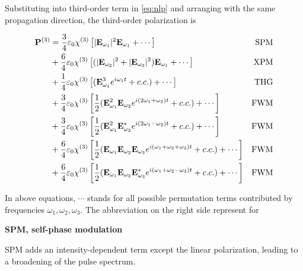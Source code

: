 Substituting into third-order term in \autoref{eq:nlp} and arranging with the same propagation direction, the third-order polarization is 

\begin{align}
  \vb{P}^{(3)} 
  & = \frac{3}{4} \varepsilon_0 \chi^{(3)} \left[| \vb{E}_{\omega_1} |^2 \vb{E}_{\omega_1} + \cdots\right] & \mathrm{SPM} \\
  & + \frac{6}{4} \varepsilon_0 \chi^{(3)} \left[(| \vb{E}_{\omega_2} |^2 + |\vb{E}_{\omega_3} |^2) \vb{E}_{\omega_1} + \cdots \right] & \mathrm{XPM} \\
  & + \frac{1}{4} \varepsilon_0 \chi^{(3)} \left[(\vb{E}_{\omega_1}^3 e^{i \omega_1 t} + c.c.) + \cdots\right] & \mathrm{THG} \\
  & + \frac{3}{4} \varepsilon_0 \chi^{(3)} \left[ \frac{1}{2} (\vb{E}_{\omega_1}^2 \vb{E}_{\omega_2} e^{i (2 \omega_1 + \omega_2) t} + c.c.) + \cdots \right] & \mathrm{FWM} \label{eq:fwm1} \\ 
  & + \frac{3}{4} \varepsilon_0 \chi^{(3)} \left[ \frac{1}{2} (\vb{E}_{\omega_1}^2 \vb{E}^{\ast}_{\omega_2} e^{i (2 \omega_1 - \omega_2) t} + c.c.) + \cdots \right] & \mathrm{FWM} \label{eq:fwm2} \\ 
  & + \frac{6}{4} \varepsilon_0 \chi^{(3)} \left[ \frac{1}{2} (\vb{E}_{\omega_1} \vb{E}_{\omega_2} \vb{E}_{\omega_3} e^{i (\omega_1 + \omega_2 + \omega_3) t} + c.c.) + \cdots \right] & \mathrm{FWM}  \label{eq:fwm3} \\
  & + \frac{6}{4} \varepsilon_0 \chi^{(3)} \left[ \frac{1}{2} (\vb{E}_{\omega_1} \vb{E}_{\omega_2} \vb{E}^{\ast}_{\omega_3} e^{i (\omega_1 + \omega_2 - \omega_3) t} + c.c.) + \cdots \right] & \mathrm{FWM} \label{eq:fwm4}
\end{align}

In above equations, $\cdots$ stands for all possible permutation terms contributed by frequencies $\omega_1, \omega_2, \omega_3$. The abbreviation on the right side represent for 

\bigskip
\noindent\textbf{SPM, self-phase modulation}

SPM adds an intensity-dependent term except the linear polarization, leading to a broadening of the pulse spectrum.

